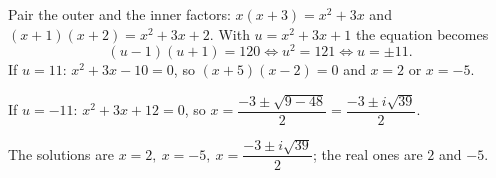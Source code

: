 Pair the outer and the inner factors: $x(x+3)=x^2+3x$ and $(x+1)(x+2)=x^2+3x+2$. With $u=x^2+3x+1$ the equation becomes
\[
(u-1)(u+1)=120\iff u^2=121\iff u=\pm11 .
\]
If $u=11$: $x^2+3x-10=0$, so $(x+5)(x-2)=0$ and $x=2$ or $x=-5$.

If $u=-11$: $x^2+3x+12=0$, so $x=\dfrac{-3\pm\sqrt{9-48}}{2}=\dfrac{-3\pm i\sqrt{39}}{2}$.

The solutions are $\boxed{x=2,\ x=-5,\ x=\dfrac{-3\pm i\sqrt{39}}{2}}$; the real ones are $2$ and $-5$.
